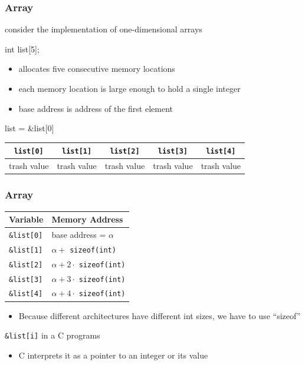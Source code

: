 \documentclass[newPxFont,sthlmFooter,nooffset]{beamer}
\begin{document}
\begin{frame}[t, fragile]
  \frametitle{Array}
consider the implementation of one-dimensional arrays

\begin{codedefnb}
int list[5];
\end{codedefnb}

\begin{itemize}
\item allocates five consecutive memory locations
\item each memory location is large enough to hold a single integer
\item base address is address of the first element
\end{itemize}

\begin{codedefnb}
list = &list[0]
\end{codedefnb}
\begin{center}
	\begin{tabular}{| c | c | c | c | c |}
		\hline
		\texttt{list[0]} & \texttt{list[1]} & \texttt{list[2]} & \texttt{list[3]} & \texttt{list[4]} \\
		\hline
		 trash value & trash value & trash value & trash value & trash value \\
		\hline
	\end{tabular}
\end{center}
\end{frame}


\begin{frame}[t, fragile]
  \frametitle{Array}
  
  \begin{tabular}{l  l}
    Variable & Memory Address \\ \hline
\texttt{\&list[0]} & base address = $\alpha$ \\
\texttt{\&list[1]} & $\alpha +$ \texttt{sizeof(int)}\\
\texttt{\&list[2]} & $\alpha + 2 \cdot$ \texttt{sizeof(int)}\\
\texttt{\&list[3]} & $\alpha + 3 \cdot$ \texttt{sizeof(int)}\\
\texttt{\&list[4]} & $\alpha + 4 \cdot$ \texttt{sizeof(int)}\\
  \end{tabular}
\begin{itemize}
	\item Because different architectures have different int sizes, we have to use ``sizeof''
\end{itemize}

\bigskip
\texttt{\&list[i]} in a C programs
\begin{itemize}
\item C interprets it as a pointer to an integer or its value
\end{itemize}

\end{frame}
\end{document}
